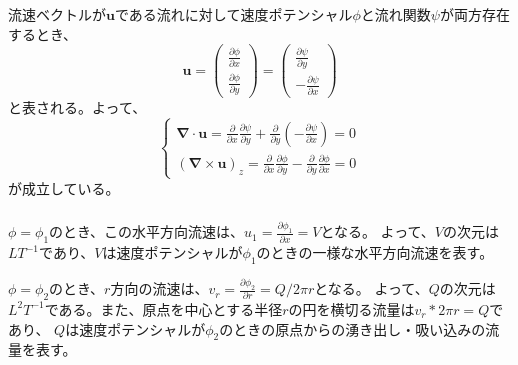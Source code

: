 \documentclass[a4paper]{jsarticle}
\begin{document}
\section{}
\subsection{}
\subsubsection{}
流速ベクトルが$\bm{u}$である流れに対して速度ポテンシャル$\phi$と流れ関数$\psi$が両方存在するとき、
\begin{equation}
  \bm{u} =
  \begin{pmatrix}
    \frac{\partial \phi}{\partial x} \\ \frac{\partial \phi}{\partial y}
  \end{pmatrix} =
  \begin{pmatrix}
    \frac{\partial \psi}{\partial y} \\ -\frac{\partial \psi}{\partial x}
  \end{pmatrix}
\end{equation}
と表される。よって、
\begin{equation}
  \begin{cases}
    \bm{\nabla} \cdot \bm{u} = 
    \frac{\partial}{\partial x} \frac{\partial \psi}{\partial y} + \frac{\partial}{\partial y} \left(-\frac{\partial \psi}{\partial x}\right) = 0 \\
    \left(\bm{\nabla} \times \bm{u}\right)_z = 
    \frac{\partial}{\partial x} \frac{\partial \phi}{\partial y} - \frac{\partial}{\partial y} \frac{\partial \phi}{\partial x} = 0
  \end{cases}
\end{equation}
が成立している。

\subsubsection{}
$\phi = \phi_1$のとき、この水平方向流速は、$u_1 = \frac{\partial \phi_1}{\partial x} = V$となる。
よって、$V$の次元は$L T^{-1}$であり、$V$は速度ポテンシャルが$\phi_1$のときの一様な水平方向流速を表す。\par
$\phi = \phi_2$のとき、$r$方向の流速は、$v_r = \frac{\partial \phi_2}{\partial r} = Q / 2 \pi r$となる。
よって、$Q$の次元は$L^2 T^{-1}$である。また、原点を中心とする半径$r$の円を横切る流量は$v_r * 2 \pi r = Q$であり、
$Q$は速度ポテンシャルが$\phi_2$のときの原点からの湧き出し・吸い込みの流量を表す。
\end{document}
